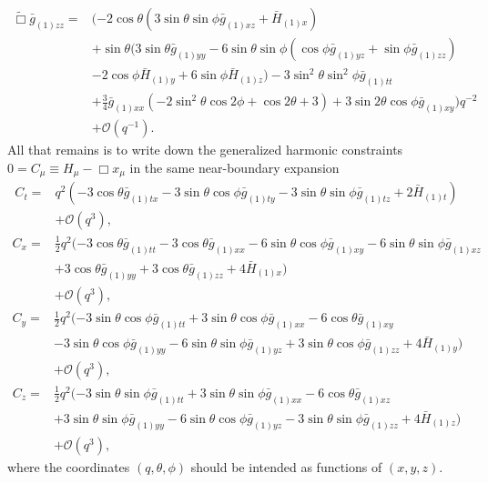 \documentclass[12pt]{iopart} %
\begin{document}
\begin{eqnarray}\label{eqn:efezz}
\tilde{\Box}\bar{g}_{(1)zz}=&(-2 \cos \theta  (3 \sin \theta  \sin \phi  \bar{g}_{(1)xz}+\bar{H}_{(1)x}) \nonumber \\
&+ \sin \theta  (3 \sin \theta  \bar{g}_{(1)yy}-6 \sin\theta  \sin \phi  (\cos \phi  \bar{g}_{(1)yz}+\sin \phi 
   \bar{g}_{(1)zz}) \nonumber \\
   &-2 \cos \phi  \bar{H}_{(1) y} +6 \sin \phi  \bar{H}_{(1)z}) -3  \sin ^2\theta  \sin ^2\phi  \bar{g}_{(1)tt} \nonumber \\
   &+\frac{3}{4}  \bar{g}_{(1)xx} (-2 \sin ^2\theta  \cos 2 \phi +\cos 2 \theta
   +3) +3 \sin 2 \theta  \cos \phi  \bar{g}_{(1)xy})  q^{-2} \nonumber \\
&+\mathcal{O}(q^{-1}).
\end{eqnarray}
All that remains is to write down the generalized harmonic constraints $0=C_\mu \equiv H_\mu-\Box x_\mu$ in the same near-boundary expansion
\begin{eqnarray}\label{eqn:ct}
C_t=&q^2 (-3 \cos \theta  \bar{g}_{(1)tx}-3 \sin \theta  \cos \phi  \bar{g}_{(1)ty}-3 \sin \theta  \sin \phi \bar{g}_{(1)tz}+2
   \bar{H}_{(1) t}) \nonumber \\
   &+\mathcal{O}(q^3),
\end{eqnarray}
\begin{eqnarray}\label{eqn:cx}
C_x=&\frac{1}{2} q^2 (-3 \cos \theta  \bar{g}_{(1)tt}-3 \cos \theta  \bar{g}_{(1)xx}-6 \sin \theta  \cos \phi  \bar{g}_{(1)xy}-6 \sin
   \theta  \sin \phi  \bar{g}_{(1)xz} \nonumber \\
   &+3 \cos \theta  \bar{g}_{(1)yy}+3
   \cos \theta  \bar{g}_{(1)zz}+4 \bar{H}_{(1) x}) \nonumber \\
   &+\mathcal{O}(q^3),
\end{eqnarray}
\begin{eqnarray}\label{eqn:cy}
C_y=&\frac{1}{2} q^2 (-3 \sin \theta  \cos \phi  \bar{g}_{(1)tt}+3 \sin
   \theta  \cos \phi  \bar{g}_{(1)xx}-6 \cos \theta  \bar{g}_{(1)xy} \nonumber \\
   &-3
   \sin \theta  \cos \phi  \bar{g}_{(1) yy}-6 \sin \theta  \sin \phi
   \bar{g}_{(1)yz}+3 \sin \theta  \cos \phi  \bar{g}_{(1)zz}+4
   \bar{H}_{(1) y}) \nonumber \\
   &+\mathcal{O}(q^3),
\end{eqnarray}
\begin{eqnarray}\label{eqn:cz}
C_z=&\frac{1}{2} q^2 (-3 \sin \theta \sin \phi  \bar{g}_{(1)tt}+3 \sin
   \theta \sin \phi \bar{g}_{(1)xx}-6 \cos \theta  \bar{g}_{(1)xz} \nonumber \\
   &+3
   \sin \theta \sin \phi  \bar{g}_{(1)yy}-6 \sin \theta  \cos \phi    \bar{g}_{(1)yz}-3 \sin \theta  \sin \phi  \bar{g}_{(1)zz}+4
   \bar{H}_{(1)z}) \nonumber \\
   &+\mathcal{O}(q^3),
\end{eqnarray}
where the coordinates $(q,\theta,\phi)$ should be intended as functions of $(x,y,z)$.
\end{document}
